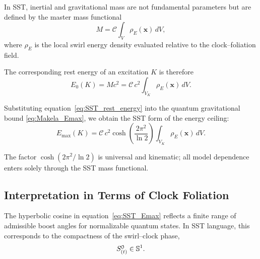 \documentclass[11pt]{article}
\newcommand{\SwirlClock}{S_{(t)}^{\mkern-2mu\scriptscriptstyle\boldsymbol{\circlearrowleft}}}
\begin{document}
            In SST, inertial and gravitational mass are not fundamental parameters but are
            defined by the master mass functional
            \begin{equation}
                M
                =
                \mathcal{C}
                \int_V
                \rho_{\!E}(\mathbf{x})\, dV ,
                \label{eq:SST_mass_functional}
            \end{equation}
            where $\rho_{\!E}$ is the local swirl energy density evaluated relative to the
            clock--foliation field.

            The corresponding rest energy of an excitation $K$ is therefore
            \begin{equation}
                E_0(K)
                =
                M c^2
                =
                \mathcal{C}\, c^2
                \int_{V_K}
                \rho_{\!E}(\mathbf{x})\, dV .
                \label{eq:SST_rest_energy}
            \end{equation}

            Substituting equation~\eqref{eq:SST_rest_energy} into the quantum gravitational
            bound \eqref{eq:Makela_Emax}, we obtain the SST form of the energy ceiling:
            \begin{equation}
                \boxed{
                    E_{\max}(K)
                    =
                    \mathcal{C}\, c^2
                    \cosh\!\left(\frac{2\pi^2}{\ln 2}\right)
                    \int_{V_K}
                    \rho_{\!E}(\mathbf{x})\, dV
                }.
                \label{eq:SST_Emax}
            \end{equation}

            The factor $\cosh(2\pi^2/\ln 2)$ is universal and kinematic; all model dependence
            enters solely through the SST mass functional.

        \subsection{Interpretation in Terms of Clock Foliation}

            The hyperbolic cosine in equation~\eqref{eq:SST_Emax} reflects a finite range of
            admissible boost angles for normalizable quantum states. In SST language, this
            corresponds to the compactness of the swirl--clock phase,
            \begin{equation}
                \SwirlClock \in \mathbb{S}^1 .
            \end{equation}
\end{document}
